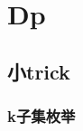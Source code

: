 \documentclass[../template.tex]{subfiles}
\begin{document}
\section{Dp}

\subsection{小trick}
\subsubsection{k子集枚举}
\end{document}
